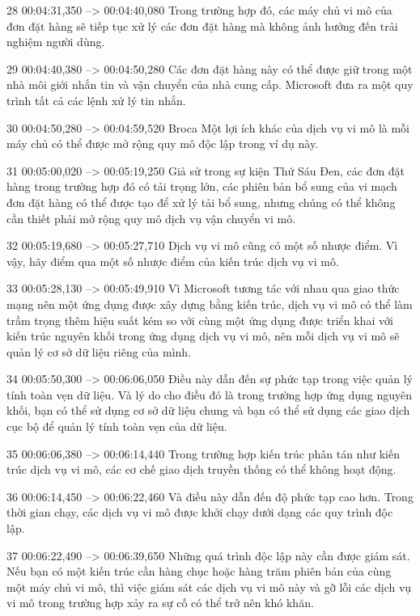28
00:04:31,350 --> 00:04:40,080
Trong trường hợp đó, các máy chủ vi mô của đơn đặt hàng sẽ tiếp tục xử lý các đơn đặt hàng mà không ảnh hưởng đến trải nghiệm người dùng.

29
00:04:40,380 --> 00:04:50,280
Các đơn đặt hàng này có thể được giữ trong một nhà môi giới nhắn tin và vận chuyển của nhà cung cấp.  Microsoft đưa ra một quy trình tất cả các lệnh xử lý tin nhắn.

30
00:04:50,280 --> 00:04:59,520
Broca Một lợi ích khác của dịch vụ vi mô là mỗi máy chủ có thể được mở rộng quy mô độc lập trong ví dụ này.

31
00:05:00,020 --> 00:05:19,250
Giả sử trong sự kiện Thứ Sáu Đen, các đơn đặt hàng trong trường hợp đó có tải trọng lớn, các phiên bản bổ sung của vi mạch đơn đặt hàng có thể được tạo để xử lý tải bổ sung, nhưng chúng có thể không cần thiết phải mở rộng quy mô dịch vụ vận chuyển vi mô.

32
00:05:19,680 --> 00:05:27,710
Dịch vụ vi mô cũng có một số nhược điểm.  Vì vậy, hãy điểm qua một số nhược điểm của kiến ​​trúc dịch vụ vi mô.

33
00:05:28,130 --> 00:05:49,910
Vì Microsoft tương tác với nhau qua giao thức mạng nên một ứng dụng được xây dựng bằng kiến ​​trúc, dịch vụ vi mô có thể làm trầm trọng thêm hiệu suất kém so với cùng một ứng dụng được triển khai với kiến ​​trúc nguyên khối trong ứng dụng dịch vụ vi mô, nên mỗi dịch vụ vi mô sẽ quản lý cơ sở dữ liệu riêng của mình.

34
00:05:50,300 --> 00:06:06,050
Điều này dẫn đến sự phức tạp trong việc quản lý tính toàn vẹn dữ liệu.  Và lý do cho điều đó là trong trường hợp ứng dụng nguyên khối, bạn có thể sử dụng cơ sở dữ liệu chung và bạn có thể sử dụng các giao dịch cục bộ để quản lý tính toàn vẹn của dữ liệu.

35
00:06:06,380 --> 00:06:14,440
Trong trường hợp kiến ​​trúc phân tán như kiến ​​trúc dịch vụ vi mô, các cơ chế giao dịch truyền thống có thể không hoạt động.

36
00:06:14,450 --> 00:06:22,460
Và điều này dẫn đến độ phức tạp cao hơn.  Trong thời gian chạy, các dịch vụ vi mô được khởi chạy dưới dạng các quy trình độc lập.

37
00:06:22,490 --> 00:06:39,650
Những quá trình độc lập này cần được giám sát.  Nếu bạn có một kiến ​​trúc cần hàng chục hoặc hàng trăm phiên bản của cùng một máy chủ vi mô, thì việc giám sát các dịch vụ vi mô này và gỡ lỗi các dịch vụ vi mô trong trường hợp xảy ra sự cố có thể trở nên khó khăn.

